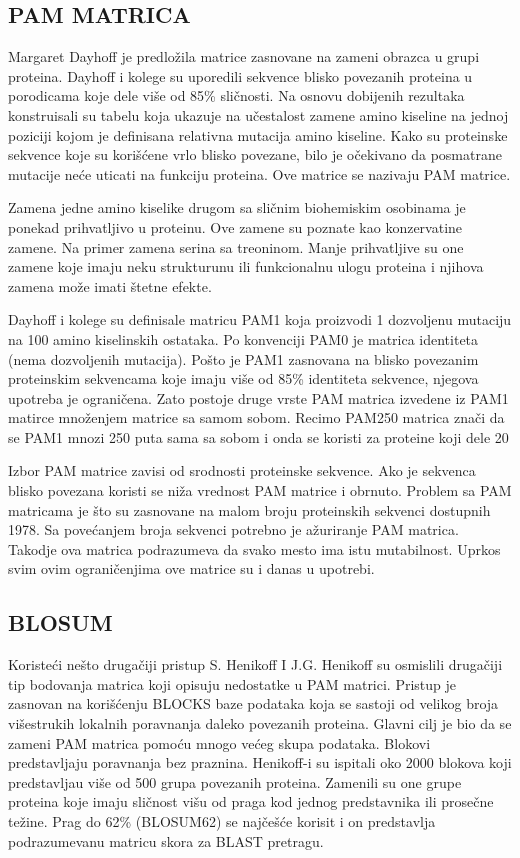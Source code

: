 \subsection{PAM MATRICA}
Margaret Dayhoff je predložila matrice zasnovane na zameni obrazca u grupi proteina. Dayhoff i kolege su uporedili sekvence blisko povezanih proteina u porodicama koje dele više od 85\% sličnosti. Na osnovu dobijenih rezultaka konstruisali su tabelu koja ukazuje na učestalost zamene amino kiseline na jednoj poziciji kojom je definisana relativna mutacija amino kiseline. Kako su proteinske sekvence koje su korišćene vrlo blisko povezane, bilo je očekivano da posmatrane mutacije neće uticati na funkciju proteina. Ove matrice se nazivaju PAM matrice.

Zamena jedne amino kiselike drugom sa sličnim biohemiskim osobinama je ponekad prihvatljivo u proteinu. Ove zamene su poznate kao konzervatine zamene. Na primer zamena serina sa treoninom. Manje prihvatljive su one zamene koje imaju neku strukturunu ili funkcionalnu ulogu proteina i njihova zamena može imati štetne efekte. 

Dayhoff i kolege su definisale matricu PAM1 koja proizvodi 1 dozvoljenu mutaciju na 100 amino kiselinskih ostataka. Po konvenciji PAM0 je matrica identiteta (nema dozvoljenih mutacija).  Pošto je PAM1 zasnovana na blisko povezanim proteinskim sekvencama koje imaju više od 85\% identiteta sekvence, njegova upotreba je ograničena. Zato postoje druge vrste PAM matrica izvedene iz PAM1 matirce množenjem matrice sa samom sobom. Recimo PAM250 matrica znači da se PAM1 mnozi 250 puta sama sa sobom i onda se koristi za proteine koji dele 20%

Izbor PAM matrice zavisi od srodnosti proteinske sekvence. Ako je sekvenca blisko povezana koristi se niža vrednost PAM matrice i obrnuto. Problem sa PAM matricama je što su zasnovane na malom broju proteinskih sekvenci dostupnih 1978. Sa povećanjem broja sekvenci potrebno je ažuriranje PAM matrica. Takodje ova matrica podrazumeva da svako mesto ima istu mutabilnost. Uprkos svim ovim ograničenjima ove matrice su i danas u upotrebi. 


\subsection{BLOSUM}
Koristeći nešto drugačiji pristup S. Henikoff I J.G. Henikoff su osmislili drugačiji tip bodovanja matrica koji opisuju nedostatke u PAM matrici. Pristup je zasnovan na korišćenju BLOCKS baze podataka koja se sastoji od velikog broja višestrukih lokalnih poravnanja daleko povezanih proteina. Glavni cilj je bio da se zameni PAM matrica pomoću mnogo većeg skupa podataka. Blokovi predstavljaju poravnanja bez praznina. Henikoff-i su ispitali oko 2000 blokova koji predstavljau više od 500 grupa povezanih proteina. Zamenili su one grupe proteina koje imaju sličnost višu od praga kod jednog predstavnika ili prosečne težine. Prag do 62\% (BLOSUM62) se najčešće korisit i on predstavlja podrazumevanu matricu skora za BLAST pretragu.

